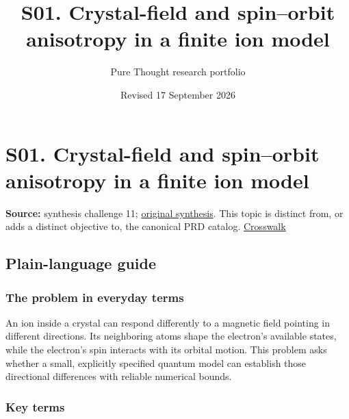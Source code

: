 \documentclass[
  11pt,
]{article}
\title{S01. Crystal-field and spin--orbit anisotropy in a finite ion
model}
\author{Pure Thought research portfolio}
\date{Revised 17 September 2026}
\begin{document}
\maketitle
\thispagestyle{empty}
\clearpage

\section{S01. Crystal-field and spin--orbit anisotropy in a finite ion
model}

\textbf{Source:} synthesis challenge 11;
\href{https://github.com/rick-stevens-ai/Pure-Thought/blob/main/NOTES/30-Most-Compelling-Pure-Thought-AI-Challenges.md}{original
synthesis}. This topic is distinct from, or adds a distinct objective
to, the canonical PRD catalog.
\href{https://github.com/rick-stevens-ai/Pure-Thought/blob/main/reviews/SYNTHESIS-CROSSWALK.md}{Crosswalk}

\subsection{Plain-language guide}

\subsubsection{The problem in everyday terms}

An ion inside a crystal can respond differently to a magnetic field
pointing in different directions. Its neighboring atoms shape the
electron's available states, while the electron's spin interacts with
its orbital motion. This problem asks whether a small, explicitly
specified quantum model can establish those directional differences with
reliable numerical bounds.

\subsubsection{Key terms}
\end{document}
